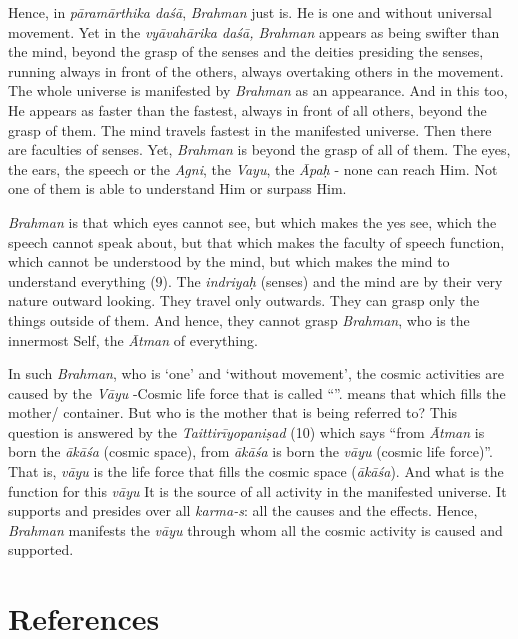 Hence, in \emph{pāramārthika daśā}, \emph{Brahman} just is. He is one and without universal movement. Yet in the \emph{vyāvahārika daśā, Brahman} appears as being swifter than the mind, beyond the grasp of the senses and the deities presiding the senses, running always in front of the others, always overtaking others in the movement. The whole universe is manifested by \emph{Brahman} as an appearance. And in this too, He appears as faster than the fastest, always in front of all others, beyond the grasp of them. The mind travels fastest in the manifested universe. Then there are faculties of senses. Yet, \emph{Brahman} is beyond the grasp of all of them. The eyes, the ears, the speech or the \emph{Agni}, the \emph{Vayu}, the \emph{Āpaḥ} - none can reach Him. Not one of them is able to understand Him or surpass Him.

\emph{Brahman} is that which eyes cannot see, but which makes the yes see, which the speech cannot speak about, but that which makes the faculty of speech function, which cannot be understood by the mind, but which makes the mind to understand everything (9). The \emph{indriyaḥ} (senses) and the mind are by their very nature outward looking. They travel only outwards. They can grasp only the things outside of them. And hence, they cannot grasp \emph{Brahman}, who is the innermost Self, the \emph{Ātman} of everything.

In such \emph{Brahman}, who is `one' and `without movement', the cosmic activities are caused by the \emph{Vāyu} -Cosmic life force that is called ``''.  means that which fills the mother/ container. But who is the mother that is being referred to? This question is answered by the \emph{Taittirīyopaniṣad} (10) which says ``from \emph{Ātman} is born the \emph{ākāśa} (cosmic space), from \emph{ākāśa} is born the \emph{vāyu} (cosmic life force)''. That is, \emph{vāyu} is the life force that fills the cosmic space (\emph{ākāśa}). And what is the function for this \emph{vāyu} It is the source of all activity in the manifested universe. It supports and presides over all \emph{karma-s}: all the causes and the effects. Hence, \emph{Brahman} manifests the \emph{vāyu} through whom all the cosmic activity is caused and supported.

\section*{References}


